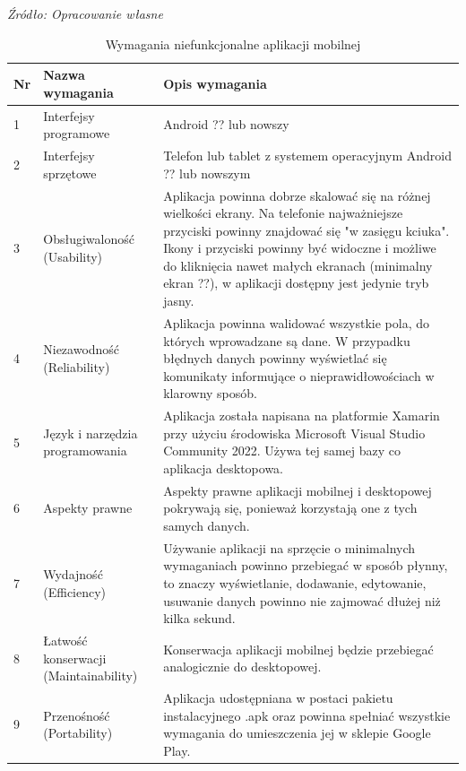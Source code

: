 \documentclass[12pt,twoside]{report}
\begin{document}
\begin{table}[H]
	\caption{Wymagania niefunkcjonalne aplikacji mobilnej }
	\textit{Źródło: Opracowanie własne}
	\label{WymaganiaNFmobilne}
	\centering
	\begin{tabular}{|l|l|p{8cm}|}
		\hline
		Nr & Nazwa wymagania & Opis wymagania\\
		\hline
		1& Interfejsy programowe& Android ?? lub nowszy \\		
		\hline
		2& Interfejsy sprzętowe& Telefon lub tablet z systemem operacyjnym Android ?? lub nowszym \\	
		\hline	
		3& Obsługiwaloność (Usability)& 
		Aplikacja powinna dobrze skalować się na różnej wielkości ekrany. Na telefonie najważniejsze przyciski powinny znajdować się "w zasięgu kciuka". Ikony i przyciski powinny być widoczne i możliwe do kliknięcia nawet małych ekranach (minimalny ekran ??), w aplikacji dostępny jest jedynie tryb jasny.\\		
		\hline
		4& Niezawodność (Reliability)&Aplikacja powinna walidować wszystkie pola, do których wprowadzane są dane. W przypadku błędnych danych powinny wyświetlać się komunikaty informujące o nieprawidłowościach w klarowny sposób. \\	
		\hline
		5& Język i narzędzia programowania& Aplikacja została napisana na platformie Xamarin przy użyciu środowiska  Microsoft Visual Studio Community 2022. Używa tej samej bazy co aplikacja desktopowa. \\	
		\hline
		6& Aspekty prawne& Aspekty prawne aplikacji mobilnej i desktopowej pokrywają się, ponieważ korzystają one z tych samych danych.\\	
		\hline
		7& Wydajność (Efficiency)&
		Używanie aplikacji na sprzęcie o minimalnych wymaganiach powinno przebiegać w sposób płynny, to znaczy wyświetlanie, dodawanie, edytowanie, usuwanie danych powinno nie zajmować dłużej niż kilka sekund. \\	
		\hline
		8& Łatwość konserwacji (Maintainability)&
		Konserwacja aplikacji mobilnej będzie przebiegać analogicznie do desktopowej. \\	
		\hline
		9& Przenośność (Portability)&Aplikacja udostępniana w postaci pakietu instalacyjnego .apk oraz powinna spełniać wszystkie wymagania do umieszczenia jej w sklepie Google Play. \\
		\hline
		
	\end{tabular}
\end{table}

\newpage
\end{document}
